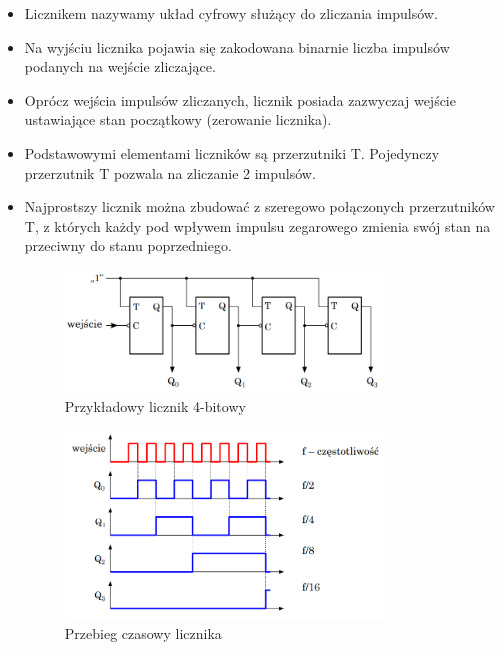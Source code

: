 \begin{itemize}
    \item Licznikem nazywamy układ cyfrowy służący do zliczania impulsów.
    \item Na wyjściu licznika pojawia się zakodowana binarnie liczba impulsów podanych na wejście zliczające. 
    \item Oprócz wejścia impulsów zliczanych, licznik posiada zazwyczaj wejście ustawiające stan początkowy (zerowanie licznika).
    \item Podstawowymi elementami liczników są przerzutniki T. Pojedynczy przerzutnik T pozwala na zliczanie 2 impulsów. 
    \item Najprostszy licznik można zbudować z szeregowo połączonych przerzutników T, z których każdy pod wpływem impulsu zegarowego zmienia swój stan na przeciwny do stanu poprzedniego.
    \begin{figure}[H]
        \centering
        \includegraphics[width=0.8\textwidth]{img/schemes/schemat_licznika_4bitowego.png}
        \caption{Przykładowy licznik 4-bitowy}
        \label{licznik:przykladowy_licznik_4bitowy}
    \end{figure}
    \begin{figure}[H]
        \centering
        \includegraphics[width=0.8\textwidth]{img/schemes/licznik_przebieg.png}
        \caption{Przebieg czasowy licznika}
        \label{licznik:przebieg}
    \end{figure}
\end{itemize}
